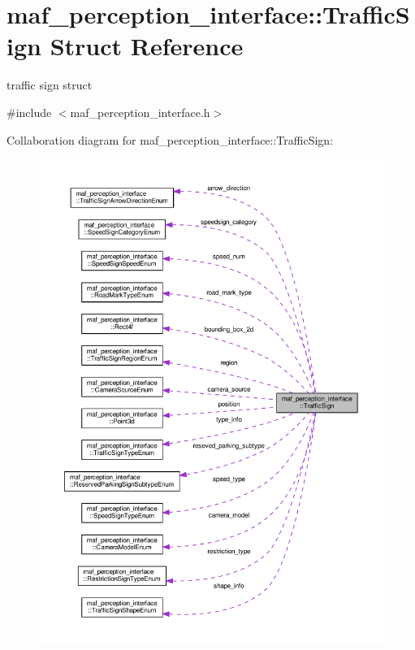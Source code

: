 \hypertarget{structmaf__perception__interface_1_1TrafficSign}{}\section{maf\+\_\+perception\+\_\+interface\+:\+:Traffic\+Sign Struct Reference}
\label{structmaf__perception__interface_1_1TrafficSign}


traffic sign struct  




{\ttfamily \#include $<$maf\+\_\+perception\+\_\+interface.\+h$>$}



Collaboration diagram for maf\+\_\+perception\+\_\+interface\+:\+:Traffic\+Sign\+:\nopagebreak
\begin{figure}[H]
\begin{center}
\leavevmode
\includegraphics[width=350pt]{structmaf__perception__interface_1_1TrafficSign__coll__graph}
\end{center}
\end{figure}
